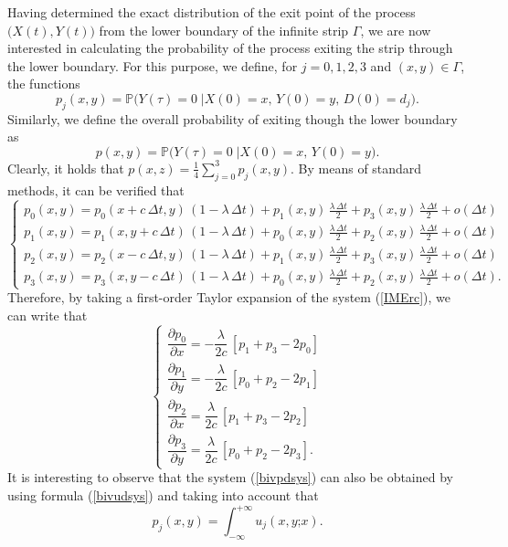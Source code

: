 \documentclass{article}
\begin{document}
Having determined the exact distribution of the exit point of the process $\big(X(t),Y(t)\big)$ from the lower boundary of the infinite strip $\Gamma$, we are now interested in calculating the probability of the process exiting the strip through the lower boundary. For this purpose, we define, for $j=0,1,2,3$ and $(x,y)\in\Gamma$, the functions \begin{equation}\label{nikol}p_j(x,y)=\mathbb{P}\Big(Y(\tau)=0\;\Big\lvert X(0)=x,\,Y(0)=y,\,D(0)=d_j\Big).\end{equation} Similarly, we define the overall probability of exiting though the lower boundary as 
$$p(x,y)=\mathbb{P}\Big(Y(\tau)=0\;\Big\lvert X(0)=x,\,Y(0)=y\Big).$$ Clearly, it holds that $p(x,z)=\frac{1}{4}\sum_{j=0}^3p_j(x,y)$. By means of standard methods, it can be verified that 
\begin{equation}\label{IMErc}
\begin{cases}
p_0(x,y)=p_0(x+c\,\Delta t,y)\,(1-\lambda\,\Delta t)+p_1(x,y)\,\frac{\lambda\,\Delta t}{2}+p_3(x,y)\,\frac{\lambda\,\Delta t}{2} + o(\Delta t)\\
p_1(x,y)=p_1(x,y+c\,\Delta t)\,(1-\lambda\,\Delta t)+p_0(x,y)\,\frac{\lambda\,\Delta t}{2}+p_2(x,y)\,\frac{\lambda\,\Delta t}{2} + o(\Delta t)\\
p_2(x,y)=p_2(x-c\,\Delta t,y)\,(1-\lambda\,\Delta t)+p_1(x,y)\,\frac{\lambda\,\Delta t}{2}+p_3(x,y)\,\frac{\lambda\,\Delta t}{2} + o(\Delta t)\\
p_3(x,y)=p_3(x,y-c\,\Delta t)\,(1-\lambda\,\Delta t)+p_0(x,y)\,\frac{\lambda\,\Delta t}{2}+p_2(x,y)\,\frac{\lambda\,\Delta t}{2} + o(\Delta t).
\end{cases}\end{equation}
Therefore, by taking a first-order Taylor expansion of the system (\ref{IMErc}), we can write that
\begin{equation}\label{bivpdsys}
\begin{cases}
\dfrac{\partial p_0}{\partial x}=-\dfrac{\lambda}{2c}\,\left[p_1+p_3-2p_0\right]\\[0.75em]
\dfrac{\partial p_1}{\partial y}=-\dfrac{\lambda}{2c}\,\left[p_0+p_2-2p_1\right]\\[0.75em]
\dfrac{\partial p_2}{\partial x}=\dfrac{\lambda}{2c}\,\left[p_1+p_3-2p_2\right]\\[0.75em]
\dfrac{\partial p_3}{\partial y}=\dfrac{\lambda}{2c}\,\left[p_0+p_2-2p_3\right].
\end{cases}\end{equation}
It is interesting to observe that the system (\ref{bivpdsys}) can also be obtained by using formula (\ref{bivudsys}) and taking into account that \begin{equation}p_j(x,y)=\int_{-\infty}^{+\infty}u_j(x,y\mathord{;}x).\label{doubleintegral}\end{equation}
\end{document}
